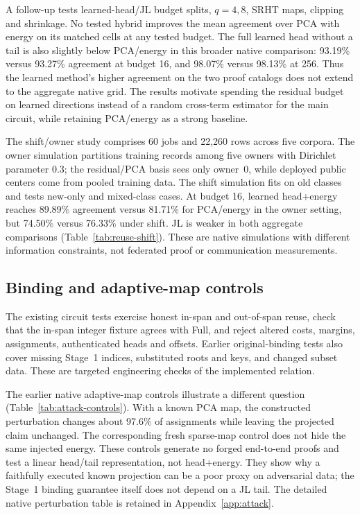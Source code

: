 A follow-up tests learned-head/JL budget splits, $q=4,8$, SRHT maps, clipping and shrinkage. No tested hybrid improves the mean agreement over PCA with energy on its matched cells at any tested budget. The full learned head without a tail is also slightly below PCA/energy in this broader native comparison: 93.19\% versus 93.27\% agreement at budget 16, and 98.07\% versus 98.13\% at 256. Thus the learned method's higher agreement on the two proof catalogs does not extend to the aggregate native grid. The results motivate spending the residual budget on learned directions instead of a random cross-term estimator for the main circuit, while retaining PCA/energy as a strong baseline.

The shift/owner study comprises 60 jobs and 22,260 rows across five corpora. The owner simulation partitions training records among five owners with Dirichlet parameter 0.3; the residual/PCA basis sees only owner~0, while deployed public centers come from pooled training data. The shift simulation fits on old classes and tests new-only and mixed-class cases. At budget 16, learned head+energy reaches 89.89\% agreement versus 81.71\% for PCA/energy in the owner setting, but 74.50\% versus 76.33\% under shift. JL is weaker in both aggregate comparisons (Table~\ref{tab:reuse-shift}). These are native simulations with different information constraints, not federated proof or communication measurements.


\subsection{Binding and adaptive-map controls}
The existing circuit tests exercise honest in-span and out-of-span reuse, check that the in-span integer fixture agrees with Full, and reject altered costs, margins, assignments, authenticated heads and offsets. Earlier original-binding tests also cover missing Stage~1 indices, substituted roots and keys, and changed subset data. These are targeted engineering checks of the implemented relation.

The earlier native adaptive-map controls illustrate a different question (Table~\ref{tab:attack-controls}). With a known PCA map, the constructed perturbation changes about 97.6\% of assignments while leaving the projected claim unchanged. The corresponding fresh sparse-map control does not hide the same injected energy. These controls generate no forged end-to-end proofs and test a linear head/tail representation, not head+energy. They show why a faithfully executed known projection can be a poor proxy on adversarial data; the Stage~1 binding guarantee itself does not depend on a JL tail.
The detailed native perturbation table is retained in Appendix~\ref{app:attack}.
